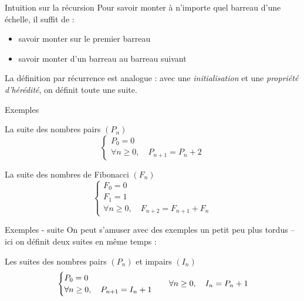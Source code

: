 \documentclass[handout]{beamer}
\begin{document}
  \begin{frame}{Intuition sur la récursion}
   Pour savoir monter à n'importe quel barreau d'une échelle, il suffit de :
   \pause
   \begin{itemize}
    \item savoir monter sur le premier barreau
    \item savoir monter d'un barreau au barreau suivant
   \end{itemize}
   \pause
   La définition par récurrence est analogue : avec une \emph{initialisation}
   et une \emph{propriété d'hérédité}, on définit toute une suite.
  \end{frame}


  \begin{frame}{Exemples}
   \begin{block}{La suite des nombres pairs $(P_n)$}
    \[
     \begin{cases}
      P_0 = 0\\
      \forall n \geq 0, \quad P_{n+1} = P_n + 2
     \end{cases}
    \]
   \end{block}
   \pause
   \begin{block}{La suite des nombres de Fibonacci $(F_n)$}
    \[
     \begin{cases}
      F_0 = 0\\
      F_1 = 1\\
      \forall n \geq 0, \quad F_{n+2} = F_{n+1} + F_n
     \end{cases}
    \]
   \end{block}
  \end{frame}


  \begin{frame}{Exemples - suite}
   On peut s'amuser avec des exemples un petit peu plus tordus -- ici on définit
   deux suites en même temps :
   \begin{block}{Les suites des nombres pairs $(P_n)$ et impairs $(I_n)$}
    \[
     \begin{array}{c c}
      \begin{cases}
       P_0 = 0\\
       \forall n \geq 0, \quad P_{n+1} = I_n + 1
      \end{cases}
      &
      \forall n \geq 0, \quad I_n = P_n + 1
      \\
     \end{array}
    \]
   \end{block}
  \end{frame}
\end{document}
